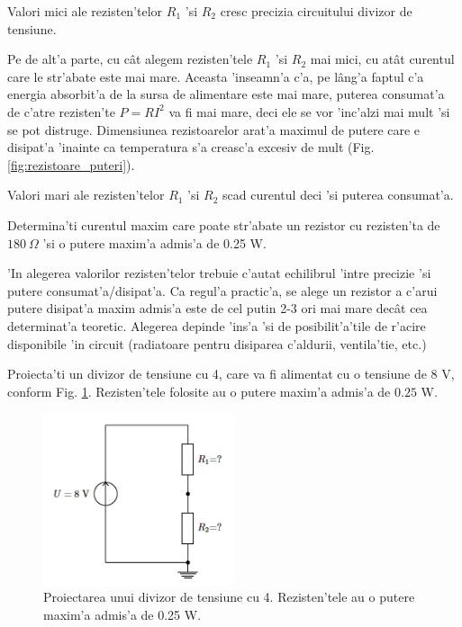 \begin{retine}
Valori mici ale rezisten'telor $R_1$ 'si $R_2$ cresc precizia circuitului divizor de tensiune.
\end{retine}

Pe de alt'a parte, cu c\^at alegem rezisten'tele $R_1$ 'si $R_2$ mai mici, cu at\^at curentul care le str'abate este mai mare. Aceasta 'inseamn'a c'a, pe l\^ang'a faptul c'a energia absorbit'a de la sursa de alimentare este mai mare, 
puterea consumat'a de c'atre rezisten'te $P = RI^2$ va fi mai mare, deci ele se vor 'inc'alzi mai mult 'si se pot distruge. Dimensiunea rezistoarelor arat'a maximul de putere care e disipat'a 'inainte ca temperatura s'a creasc'a excesiv de mult (Fig. \ref{fig:rezistoare_puteri}).

\begin{retine}
Valori mari ale rezisten'telor $R_1$ 'si $R_2$ scad curentul deci 'si puterea consumat'a.
\end{retine}

\begin{exercise}
Determina'ti curentul maxim care poate str'abate un rezistor cu rezisten'ta de $180~\Omega$ 'si o putere maxim'a admis'a de 0.25 W. 
\end{exercise}

'In alegerea valorilor rezisten'telor trebuie c'autat echilibrul 'intre precizie 'si putere consumat'a/disipat'a. Ca regul'a practic'a, se alege un rezistor a c'arui putere disipat'a maxim admis'a este de cel putin 2-3 ori mai mare dec\^at cea determinat'a teoretic. Alegerea depinde 'ins'a 'si de posibilit'a'tile de r'acire disponibile 'in circuit (radiatoare pentru disiparea c'aldurii, ventila'tie, etc.) 

\begin{exercise}
Proiecta'ti un divizor de tensiune cu 4, care va fi alimentat cu o tensiune de $8$ V, conform Fig. \ref{fig:7_exercitiul1}. Rezisten'tele folosite au o putere maxim'a admis'a de $0.25$ W.
\end{exercise}

\begin{figure}[!t]
	\centering
		\includegraphics[width=0.5\textwidth]{laborator_01/figuri/7_exercitiul1}
	\caption{Proiectarea unui divizor de tensiune cu 4. Rezisten'tele au o putere maxim'a admis'a de 0.25 W.}
	\label{fig:7_exercitiul1}
\end{figure}